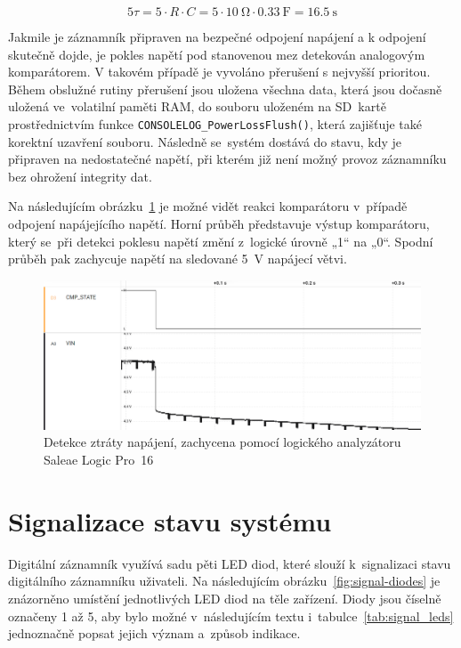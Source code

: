 \[
    5\tau = 5 \cdot R \cdot C = 5 \cdot \SI{10}{\ohm} \cdot \SI{0.33}{\farad} = \SI{16.5}{\second}
\]

Jakmile je záznamník připraven na bezpečné odpojení napájení a k odpojení skutečně dojde, je pokles napětí pod stanovenou mez detekován analogovým komparátorem. V takovém případě je vyvoláno přerušení s nejvyšší prioritou. Během obslužné rutiny přerušení jsou uložena všechna data, která jsou dočasně uložená ve~volatilní paměti RAM, do souboru uloženém na SD~kartě prostřednictvím funkce \texttt{CONSOLELOG\_PowerLossFlush()}, která zajišťuje také korektní uzavření souboru. Následně se~systém dostává do stavu, kdy je připraven na nedostatečné napětí, při kterém již není možný provoz záznamníku bez ohrožení integrity dat.

Na následujícím obrázku~\ref{fig:pwrloss-detection-saleae} je možné vidět reakci komparátoru v~případě odpojení napájejícího napětí.  Horní průběh představuje výstup komparátoru, který se~při detekci poklesu napětí změní z~logické úrovně „1“ na „0“. Spodní průběh pak zachycuje napětí na sledované \SI{5}{\volt} napájecí větvi.

\begin{figure}[h]
    \centering
    \includegraphics[width=1.00\textwidth]{obrazky-figures/saleae-power-loss-det.png}
    
    \caption{Detekce ztráty napájení, zachycena pomocí logického analyzátoru Saleae Logic Pro~16}
    \label{fig:pwrloss-detection-saleae}
\end{figure}

\newpage

\section{Signalizace stavu systému}
\label{signalizace_stavu_systemu}
Digitální záznamník využívá sadu pěti LED diod, které slouží k~signalizaci stavu digitálního záznamníku uživateli. Na následujícím obrázku~\ref{fig:signal-diodes} je znázorněno umístění jednotlivých LED diod na těle zařízení. Diody jsou číselně označeny 1 až 5, aby bylo možné v~následujícím textu i~tabulce~\ref{tab:signal_leds} jednoznačně popsat jejich význam a~způsob indikace.

